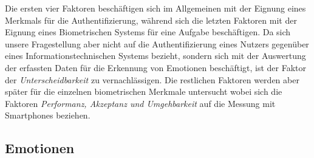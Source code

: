 Die ersten vier Faktoren beschäftigen sich im Allgemeinen mit der Eignung eines Merkmals für die Authentifizierung, während sich die letzten Faktoren mit der Eignung eines Biometrischen Systems für eine Aufgabe beschäftigen. Da sich unsere Fragestellung aber nicht auf die Authentifizierung eines Nutzers gegenüber eines Informationstechnischen Systems bezieht, sondern sich mit der Auswertung der erfassten Daten für die Erkennung von Emotionen beschäftigt, ist der Faktor der \textit{Unterscheidbarkeit} zu vernachlässigen. Die restlichen Faktoren werden aber später für die einzelnen biometrischen Merkmale untersucht wobei sich die Faktoren \textit{Performanz, Akzeptanz und Umgehbarkeit} auf die Messung mit Smartphones beziehen.
\subsection{Emotionen}
